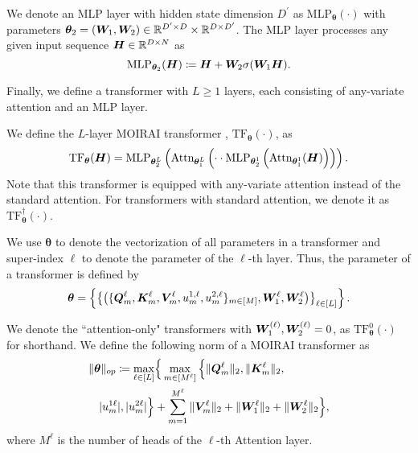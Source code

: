 \begin{definition}
    {\normalfont
    We denote an MLP layer with hidden state dimension $D^\prime$ as $\text{MLP}_{\bm{\theta}}(\cdot)$ with parameters $\bm{\theta}_2 = ( \bm{W}_1, \bm{W}_2 ) \in \mathbb{R}^{ D^\prime \times D } \times \mathbb{R}^{D \times D^\prime}$.
    The MLP layer processes any given input sequence $\boldsymbol{H} \in \mathbb{R}^{D \times N}$ as
    }
    \begin{equation*}
        \text{MLP}_{\bm{\theta}_2} (\boldsymbol{H})
        \coloneqq
        \boldsymbol{H} +
        \bm{W}_2 \sigma(\bm{W}_1 \boldsymbol{H}).
    \end{equation*}
\end{definition}
Finally, we define a transformer with $L \geq 1$ layers, each consisting of any-variate attention and an MLP layer.
\begin{definition}\label{def:moirai}
    {
    \normalfont
    We define the $L$-layer MOIRAI transformer \cite{woo2024unified}, $\text{TF}_{\bm{\theta}}(\cdot)$, as
    }
    \begin{equation*}
        \text{TF}_{\bm{\theta}}(\boldsymbol{H})
        =
        \text{MLP}_{\bm{\theta}_2^L}
        \left(
        \text{Attn}_{\bm{\theta}_1^L}
        \left(
        \cdot \cdot
        \text{MLP}_{\bm{\theta}_2^1}
        \left(
        \text{Attn}_{\bm{\theta}_1^1}
        (\boldsymbol{H})
        \right)
        \right)
        \right)
        .
    \end{equation*}
    Note that this transformer is equipped with any-variate attention instead of the standard attention.
    For transformers with standard attention, we denote it as 
    $\text{TF}_{\bm{\theta}}^{\dagger}(\cdot)$.
\end{definition}

We use $\bm{\theta}$ to denote the vectorization of all parameters in a transformer and super-index $\ell$ to denote the parameter of the $\ell$-th layer.
Thus, the parameter of a transformer is defined by
\begin{equation*}
        \boldsymbol{\theta} = 
        \left\{
        \left\{
        \left(\{\boldsymbol{Q}_m^\ell,\boldsymbol{K}_m^\ell,\boldsymbol{V}_m^\ell, u_m^{1, \ell}, u_m^{2, \ell}\}_{m\in[M]}, \boldsymbol{W}_{1}^\ell,\boldsymbol{W}_{2}^\ell
        \right)
        \right\}_{\ell\in[L]}
        \right\}.
\end{equation*}    

We denote the ``attention-only" transformers with $\bm{W}_1^{(\ell)}, \bm{W}_2^{(\ell)} = 0$, as $\text{TF}_{\bm{\theta}}^0(\cdot)$ for shorthand.
We define the following norm of a MOIRAI transformer as
\begin{align*}
    \Vert\boldsymbol{\theta}\Vert_{op}
    \coloneqq
    \max_{\ell\in[L]}
    &\Big\{\max_{m\in[M^{\ell}]}
    \Big\{\Vert \boldsymbol{Q}_m^\ell\Vert_2,\Vert\boldsymbol{K}_m^\ell\Vert_2,
        \\
        \vert u_m^{1\ell} \vert , \vert u_m^{2\ell} \vert 
    \Big\}
    &+
    \sum_{m=1}^{M^{\ell}}\Vert\boldsymbol{V}_m^\ell\Vert_2+\Vert\boldsymbol{W}_1^{\ell}\Vert_2+\Vert\boldsymbol{W}_2^{\ell}\Vert_2 \Big\}, 
\end{align*}
where $M^{\ell}$ is the number of heads of the $\ell$-th Attention layer.



